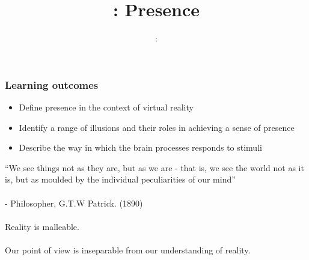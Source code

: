 \usepackage{../../beamerthemeFalmouthGamesAcademy}
\usepackage{multimedia}
\graphicspath{ {../../} }


\usepackage[normalem]{ulem}
\usepackage{wasysym}

\usepackage{pdfpages}

\usetikzlibrary{arrows,automata}




\title{\sessionnumber: Presence}
\subtitle{\modulecode: \moduletitle}

\frame{\titlepage} 

\begin{frame}
	\frametitle{Learning outcomes}
	\begin{itemize}
		\item Define presence in the context of virtual reality
		\item Identify a range of illusions and their roles in achieving a sense of presence
		\item Describe the way in which the brain processes responds to stimuli
	\end{itemize}
\end{frame}

\begin{frame}
	``We see things not as they are, but as we are - that is, we see the world not as it is, but as moulded by the individual peculiarities of our mind'' \\~\\ - Philosopher, G.T.W Patrick. (1890) \\~\\
	\pause
	Reality is malleable. \\~\\ 
	\pause
	Our point of view is inseparable from our understanding of reality. 	
	
\end{frame}


